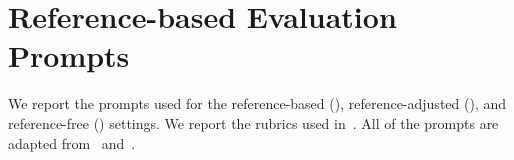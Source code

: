 


\section{Reference-based Evaluation Prompts}\label{sec:6-appendix-prompts}
We report the prompts used for the reference-based (), reference-adjusted (), and reference-free () settings. We report the rubrics used in~. All of the prompts are adapted from~\textcite{kim2023prometheus} and~\textcite{fabbri2021summeval}.



